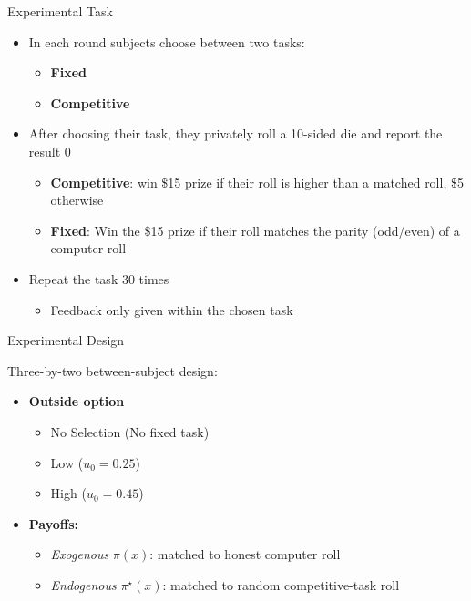 \documentclass{beamer}
\begin{document}
\begin{frame}{Experimental Task}
    \begin{itemize}
        \item In each round subjects choose between two tasks:
            \begin{itemize}
                \item \textbf{Fixed}
                \item \textbf{Competitive}
            \end{itemize}
        \item After choosing their task, they privately roll a 10-sided die and
        report the result 0
            \begin{itemize}
                \item \textbf{Competitive}: win \$15 prize if their roll is higher than a matched roll, \$5 otherwise
                \item \textbf{Fixed}: Win the \$15 prize if their roll matches the parity (odd/even) of a computer roll
            \end{itemize}
        \item Repeat the task 30 times
            \begin{itemize}
                \item Feedback only given within the chosen task
            \end{itemize}
    \end{itemize}
\end{frame}

\begin{frame}{Experimental Design}

Three-by-two between-subject design:
    \begin{itemize}
        \item \textbf{Outside option}
            \begin{itemize}
                \item No Selection (No fixed task)
                \item Low ($u_{0}=0.25$)
                \item High ($u_{0}=0.45$)
            \end{itemize}
        \item \textbf{Payoffs:}
            \begin{itemize}
                \item \emph{Exogenous} \textrm{$\pi(x)$}: matched to honest computer roll
                \item \emph{Endogenous} \textrm{$\pi^{\star}(x)$}: matched to random competitive-task roll
            \end{itemize}
    \end{itemize}
\end{frame}
\end{document}
